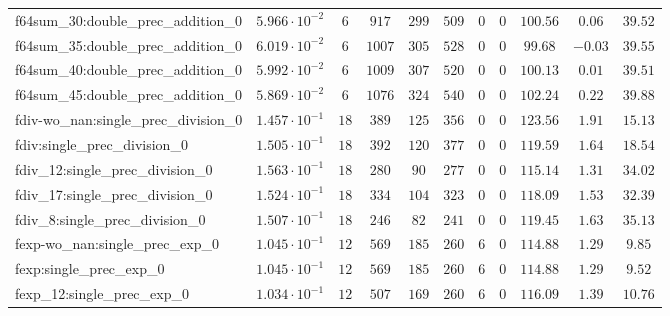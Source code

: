 \begin{tabular}{|l|c|c|c|c|c|c|c|c|c|c|}
f64sum\_30:double\_prec\_addition\_0           & $ 5.966 \cdot 10^{-2} $ & $ 6      $ & $ 917    $ & $ 299   $ & $ 509   $ & $ 0   $ & $ 0 $ & $ 100.56      $ & $ 0.06    $ & $ 39.52   $ \\
f64sum\_35:double\_prec\_addition\_0           & $ 6.019 \cdot 10^{-2} $ & $ 6      $ & $ 1007   $ & $ 305   $ & $ 528   $ & $ 0   $ & $ 0 $ & $ 99.68       $ & $ -0.03   $ & $ 39.55   $ \\
f64sum\_40:double\_prec\_addition\_0           & $ 5.992 \cdot 10^{-2} $ & $ 6      $ & $ 1009   $ & $ 307   $ & $ 520   $ & $ 0   $ & $ 0 $ & $ 100.13      $ & $ 0.01    $ & $ 39.51   $ \\
f64sum\_45:double\_prec\_addition\_0           & $ 5.869 \cdot 10^{-2} $ & $ 6      $ & $ 1076   $ & $ 324   $ & $ 540   $ & $ 0   $ & $ 0 $ & $ 102.24      $ & $ 0.22    $ & $ 39.88   $ \\
fdiv-wo\_nan:single\_prec\_division\_0         & $ 1.457 \cdot 10^{-1} $ & $ 18     $ & $ 389    $ & $ 125   $ & $ 356   $ & $ 0   $ & $ 0 $ & $ 123.56      $ & $ 1.91    $ & $ 15.13   $ \\
fdiv:single\_prec\_division\_0                 & $ 1.505 \cdot 10^{-1} $ & $ 18     $ & $ 392    $ & $ 120   $ & $ 377   $ & $ 0   $ & $ 0 $ & $ 119.59      $ & $ 1.64    $ & $ 18.54   $ \\
fdiv\_12:single\_prec\_division\_0             & $ 1.563 \cdot 10^{-1} $ & $ 18     $ & $ 280    $ & $ 90    $ & $ 277   $ & $ 0   $ & $ 0 $ & $ 115.14      $ & $ 1.31    $ & $ 34.02   $ \\
fdiv\_17:single\_prec\_division\_0             & $ 1.524 \cdot 10^{-1} $ & $ 18     $ & $ 334    $ & $ 104   $ & $ 323   $ & $ 0   $ & $ 0 $ & $ 118.09      $ & $ 1.53    $ & $ 32.39   $ \\
fdiv\_8:single\_prec\_division\_0              & $ 1.507 \cdot 10^{-1} $ & $ 18     $ & $ 246    $ & $ 82    $ & $ 241   $ & $ 0   $ & $ 0 $ & $ 119.45      $ & $ 1.63    $ & $ 35.13   $ \\
fexp-wo\_nan:single\_prec\_exp\_0              & $ 1.045 \cdot 10^{-1} $ & $ 12     $ & $ 569    $ & $ 185   $ & $ 260   $ & $ 6   $ & $ 0 $ & $ 114.88      $ & $ 1.29    $ & $ 9.85    $ \\
fexp:single\_prec\_exp\_0                      & $ 1.045 \cdot 10^{-1} $ & $ 12     $ & $ 569    $ & $ 185   $ & $ 260   $ & $ 6   $ & $ 0 $ & $ 114.88      $ & $ 1.29    $ & $ 9.52    $ \\
fexp\_12:single\_prec\_exp\_0                  & $ 1.034 \cdot 10^{-1} $ & $ 12     $ & $ 507    $ & $ 169   $ & $ 260   $ & $ 6   $ & $ 0 $ & $ 116.09      $ & $ 1.39    $ & $ 10.76   $ \\

\end{tabular}
